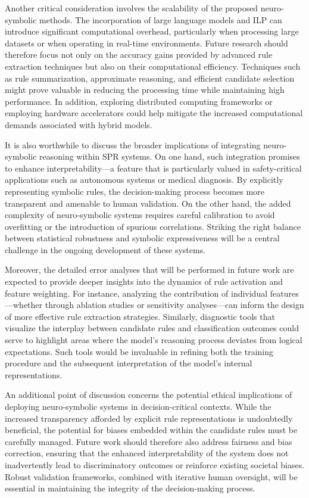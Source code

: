 \documentclass{article}
\begin{document}
Another critical consideration involves the scalability of the proposed neuro-symbolic methods. The incorporation of large language models and ILP can introduce significant computational overhead, particularly when processing large datasets or when operating in real-time environments. Future research should therefore focus not only on the accuracy gains provided by advanced rule extraction techniques but also on their computational efficiency. Techniques such as rule summarization, approximate reasoning, and efficient candidate selection might prove valuable in reducing the processing time while maintaining high performance. In addition, exploring distributed computing frameworks or employing hardware accelerators could help mitigate the increased computational demands associated with hybrid models.

It is also worthwhile to discuss the broader implications of integrating neuro-symbolic reasoning within SPR systems. On one hand, such integration promises to enhance interpretability—a feature that is particularly valued in safety-critical applications such as autonomous systems or medical diagnosis. By explicitly representing symbolic rules, the decision-making process becomes more transparent and amenable to human validation. On the other hand, the added complexity of neuro-symbolic systems requires careful calibration to avoid overfitting or the introduction of spurious correlations. Striking the right balance between statistical robustness and symbolic expressiveness will be a central challenge in the ongoing development of these systems.

Moreover, the detailed error analyses that will be performed in future work are expected to provide deeper insights into the dynamics of rule activation and feature weighting. For instance, analyzing the contribution of individual features—whether through ablation studies or sensitivity analyses—can inform the design of more effective rule extraction strategies. Similarly, diagnostic tools that visualize the interplay between candidate rules and classification outcomes could serve to highlight areas where the model’s reasoning process deviates from logical expectations. Such tools would be invaluable in refining both the training procedure and the subsequent interpretation of the model’s internal representations.

An additional point of discussion concerns the potential ethical implications of deploying neuro-symbolic systems in decision-critical contexts. While the increased transparency afforded by explicit rule representations is undoubtedly beneficial, the potential for biases embedded within the candidate rules must be carefully managed. Future work should therefore also address fairness and bias correction, ensuring that the enhanced interpretability of the system does not inadvertently lead to discriminatory outcomes or reinforce existing societal biases. Robust validation frameworks, combined with iterative human oversight, will be essential in maintaining the integrity of the decision-making process.
\end{document}
